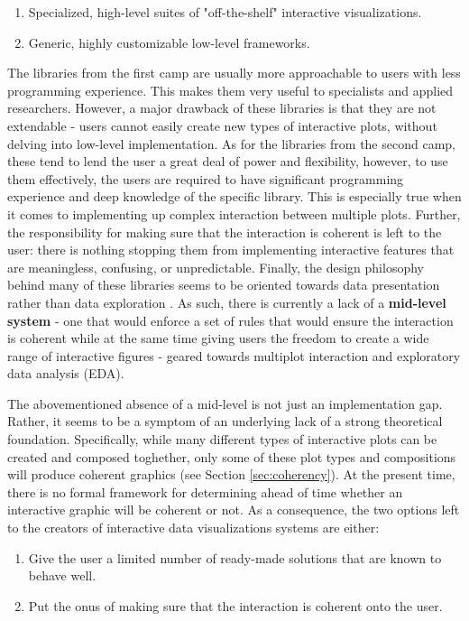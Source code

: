 \documentclass[12pt,a4paper]{article}
\begin{document}
\begin{enumerate}

\item Specialized, high-level suites of "off-the-shelf" interactive visualizations.
\item Generic, highly customizable low-level frameworks.

\end{enumerate}

The libraries from the first camp are usually more approachable to users with less programming experience. This makes them very useful to specialists and applied researchers. However, a major drawback of these libraries is that they are not extendable - users cannot easily create new types of interactive plots, without delving into low-level implementation. As for the libraries from the second camp, these tend to lend the user a great deal of power and flexibility, however, to use them effectively, the users are required to have significant programming experience and deep knowledge of the specific library. This is especially true when it comes to implementing up complex interaction between multiple plots. Further, the responsibility for making sure that the interaction is coherent is left to the user: there is nothing stopping them from implementing interactive features that are meaningless, confusing, or unpredictable. Finally, the design philosophy behind many of these libraries seems to be oriented towards data presentation rather than data exploration \citep{batch2017}. As such, there is currently a lack of a \textbf{mid-level system} - one that would enforce a set of rules that would ensure the interaction is coherent while at the same time giving users the freedom to create a wide range of interactive figures - geared towards multiplot interaction and exploratory data analysis (EDA). 

The abovementioned absence of a mid-level is not just an implementation gap. Rather, it seems to be a symptom of an underlying lack of a strong theoretical foundation. Specifically, while many different types of interactive plots can be created and composed toghether, only some of these plot types and compositions will produce coherent graphics (see Section \ref{sec:coherency}). At the present time, there is no formal framework for determining ahead of time whether an interactive graphic will be coherent or not. As a consequence, the two options left to the creators of interactive data visualizations systems are either:

\begin{enumerate}

\item  Give the user a limited number of ready-made solutions that are known to behave well.
\item Put the onus of making sure that the interaction is coherent onto the user.

\end{enumerate}
\end{document}
